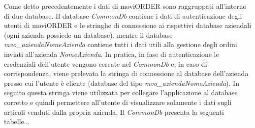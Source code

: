 Come detto precedentemente i dati di moviORDER sono raggruppati all'interno di due database. Il database \textit{CommonDb} contiene i dati di autenticazione degli utenti di moviORDER e le stringhe di connessione ai rispettivi database aziendali (ogni azienda possiede un database), mentre il database \textit{mvo\_aziendaNomeAzienda} contiene tutti i dati utili alla gestione degli ordini inviati all'azienda \textit{NomeAzienda}. In pratica, in fase di autenticazione le credenziali dell'utente vengono cercate nel \textit{CommonDb} e, in caso di corrispondenza, viene prelevata la stringa di connessione al database dell'azienda presso cui l'utente è cliente (database del tipo \textit{mvo_aziendaNomeAzienda}). In seguito questa stringa viene utilizzata per collegare l'applicazione al database corretto e quindi permettere all'utente di visualizzare solamente i dati sugli articoli venduti dalla propria azienda.
Il \textit{CommonDb} presenta la seguenti tabelle...

